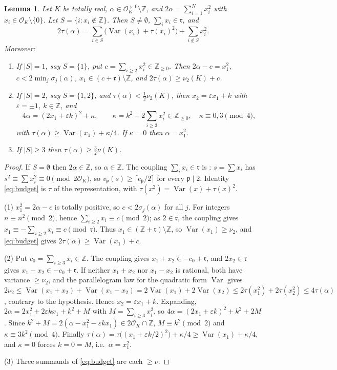 \documentclass[11pt,reqno]{amsart}
\theoremstyle{plain}
\newtheorem{lemma}[theorem]{Lemma}
\theoremstyle{definition}
\newcommand{\Z}{\mathbb{Z}}
\newcommand{\OK}{\mathcal{O}_K}
\newcommand{\rr}{\mathfrak{r}}
\newcommand{\pp}{\mathfrak{p}}
\newcommand{\tp}{\succ 0}
\DeclareMathOperator{\Var}{Var}
\begin{document}
\begin{lemma}\label{lem:anatomy}
Let $K$ be totally real, $\alpha\in\OK^{\tp}\setminus\Z$, and $2\alpha=\sum_{i=1}^{N}x_i^{2}$ with
$x_i\in\OK\setminus\{0\}$. Let $S=\{i:x_i\notin\Z\}$. Then $S\neq\emptyset$, $\sum_ix_i\in\rr$, and
\begin{equation}\label{eq:budget}
 2\tau(\alpha)=\sum_{i\in S}\bigl(\Var(x_i)+\tau(x_i)^{2}\bigr)+\sum_{i\notin S}x_i^{2}.
\end{equation}
Moreover:
\begin{enumerate}
\item If $|S|=1$, say $S=\{1\}$, put $c=\sum_{i\ge2}x_i^{2}\in\Z_{\ge0}$. Then $2\alpha-c=x_1^{2}$,
$c<2\min_j\sigma_j(\alpha)$, $x_1\in(c+\rr)\setminus\Z$, and $2\tau(\alpha)\ge\nu_2(K)+c$.
\item If $|S|=2$, say $S=\{1,2\}$, and $\tau(\alpha)<\frac12\nu_2(K)$, then $x_2=\varepsilon x_1+k$
with $\varepsilon=\pm1$, $k\in\Z$, and
\[
 4\alpha=(2x_1+\varepsilon k)^{2}+\kappa,\qquad \kappa=k^{2}+2\sum_{i\ge3}x_i^{2}\in\Z_{\ge0},\quad
 \kappa\equiv0,3\pmod 4,
\]
with $\tau(\alpha)\ge\Var(x_1)+\kappa/4$. If $\kappa=0$ then $\alpha=x_1^{2}$.
\item If $|S|\ge3$ then $\tau(\alpha)\ge\frac32\nu(K)$.
\end{enumerate}
\end{lemma}

\begin{proof}
If $S=\emptyset$ then $2\alpha\in\Z$, so $\alpha\in\Z$. The coupling $\sum_ix_i\in\rr$ is
\cite[dyadic coupling lemma]{PB}: $s=\sum x_i$ has $s^{2}\equiv\sum x_i^{2}\equiv0\pmod{2\OK}$, so
$v_\pp(s)\ge\lceil e_\pp/2\rceil$ for every $\pp\mid2$. Identity \eqref{eq:budget} is $\tau$ of the
representation, with $\tau(x^{2})=\Var(x)+\tau(x)^{2}$.

(1) $x_1^{2}=2\alpha-c$ is totally positive, so $c<2\sigma_j(\alpha)$ for all $j$. For integers
$n\equiv n^{2}\pmod 2$, hence $\sum_{i\ge2}x_i\equiv c\pmod{2}$; as $2\in\rr$, the coupling gives
$x_1\equiv-\sum_{i\ge2}x_i\equiv c\pmod\rr$. Thus $x_1\in(\Z+\rr)\setminus\Z$, so
$\Var(x_1)\ge\nu_2$, and \eqref{eq:budget} gives $2\tau(\alpha)\ge\Var(x_1)+c$.

(2) Put $c_0=\sum_{i\ge3}x_i\in\Z$. The coupling gives $x_1+x_2\in-c_0+\rr$, and $2x_2\in\rr$ gives
$x_1-x_2\in-c_0+\rr$. If neither $x_1+x_2$ nor $x_1-x_2$ is rational, both have variance
$\ge\nu_2$, and the parallelogram law for the quadratic form $\Var$ gives
$2\nu_2\le\Var(x_1+x_2)+\Var(x_1-x_2)=2\Var(x_1)+2\Var(x_2)\le2\tau(x_1^2)+2\tau(x_2^2)\le4\tau(\alpha)$,
contrary to the hypothesis. Hence $x_2=\varepsilon x_1+k$. Expanding,
$2\alpha=2x_1^{2}+2\varepsilon kx_1+k^{2}+M$ with $M=\sum_{i\ge3}x_i^{2}$, so
$4\alpha=(2x_1+\varepsilon k)^{2}+k^{2}+2M$. Since $k^{2}+M=2(\alpha-x_1^{2}-\varepsilon kx_1)\in2\OK\cap\Z$,
$M\equiv k^{2}\pmod2$ and $\kappa\equiv3k^{2}\pmod4$. Finally
$\tau(\alpha)=\tau\bigl((x_1+\varepsilon k/2)^{2}\bigr)+\kappa/4\ge\Var(x_1)+\kappa/4$, and $\kappa=0$
forces $k=0=M$, i.e.\ $\alpha=x_1^{2}$.

(3) Three summands of \eqref{eq:budget} are each $\ge\nu$.
\end{proof}
\end{document}
